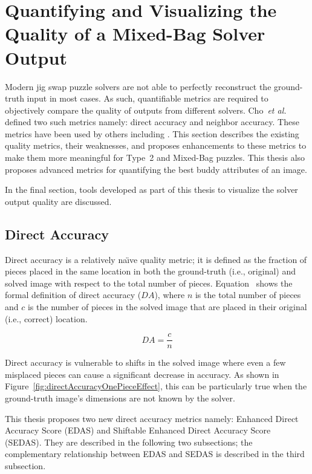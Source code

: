 \chapter{Quantifying and Visualizing the Quality of a Mixed-Bag Solver Output}\label{sec:quantifyingSolverQuantify}

Modern jig swap puzzle solvers are not able to perfectly reconstruct the ground-truth input in most cases.  As such, quantifiable metrics are required to objectively compare the quality of outputs from different solvers.  Cho~\textit{et al.}~\cite{cho2010} defined two such metrics namely: direct accuracy and neighbor accuracy. These metrics have been used by others including \cite{sholomon2013, pomeranz2011, paikin2015, son2014, gallagher2012}.  This section describes the existing quality metrics, their weaknesses, and proposes enhancements to these metrics to make them more meaningful for Type~2 and Mixed-Bag puzzles.  This thesis also proposes advanced metrics for quantifying the best buddy attributes of an image.

In the final section, tools developed as part of this thesis to visualize the solver output quality are discussed.

\section{Direct Accuracy}\label{sec:directAccuracy}

Direct accuracy is a relatively na\"{\i}ve quality metric; it is defined as the fraction of pieces placed in the same location in both the ground-truth (i.e., original) and solved image with respect to the total number of pieces.  Equation~ shows the formal definition of direct accuracy ($DA$), where $n$ is the total number of pieces and $c$ is the number of pieces in the solved image that are placed in their original (i.e., correct) location.

\begin{equation} \label{eq:directAccuracy}
DA = \frac{c}{n}
\end{equation}

Direct accuracy is vulnerable to shifts in the solved image where even a few misplaced pieces can cause a significant decrease in accuracy.  As shown in Figure~\ref{fig:directAccuracyOnePieceEffect}, this can be particularly true when the ground-truth image's dimensions are not known by the solver.

This thesis proposes two new direct accuracy metrics namely: Enhanced Direct Accuracy Score (EDAS) and Shiftable Enhanced Direct Accuracy Score (SEDAS).  They are described in the following two subsections; the complementary relationship between EDAS and SEDAS is described in the third subsection.

